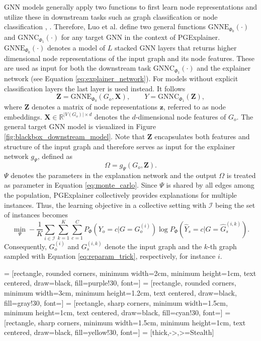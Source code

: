 GNN models generally apply two functions to first learn node representations and utilize these in downstream tasks such as graph classification or node classification \cite{kipf2016semi}, \cite{velivckovic2017graph}. Therefore, Luo et al. \cite{luo2020parameterized} define two general functions $\text{GNNE}_{\Phi_0}(\cdot)$ and $\text{GNNC}_{\Phi_1}(\cdot)$ for any target GNN in the context of PGExplainer. $\text{GNNE}_{\Phi_0}(\cdot)$ denotes a model of $L$ stacked GNN layers that returns higher dimensional node representations of the input graph and its node features. These are used as input for both the downstream task $\text{GNNC}_{\Phi_1}(\cdot)$ and the explainer network (see Equation \ref{eq:explainer_network}). For models without explicit classification layers the last layer is used instead. It follows
\begin{equation}
    \mathbf{Z} = \text{GNNE}_{\Phi_0}(G_o, \mathbf{X}), \qquad Y = \text{GNNC}_{\Phi_1}(\mathbf{Z}),
\end{equation}
where $\mathbf{Z}$ denotes a matrix of node representations $\mathbf{z}$, referred to as node embeddings. $\mathbf{X} \in \mathbb{R}^{|V(G_o)|\times d}$ denotes the $d$-dimensional node features of $G_o$. The general target GNN model is visualized in Figure \ref{fig:blackbox_downstream_model}. Note that $\mathbf{Z}$ encapsulates both features and structure of the input graph and therefore serves as input for the explainer network $g_\Psi$, defined as
\begin{equation}
    \label{eq:explainer_network}
    \Omega = g_\Psi(G_o,\mathbf{Z}).
\end{equation}
$\Psi$ denotes the parameters in the explanation network and the output $\Omega$ is treated as parameter in Equation \ref{eq:monte_carlo}. Since $\Psi$ is shared by all edges among the population, PGExplainer collectively provides explanations for multiple instances. Thus, the learning objective in a collective setting with $\mathcal{I}$ being the set of instances becomes
\begin{equation}
    \label{eq:mlp_loss}
    \min_\Psi -\frac{1}{K}\sum_{i\in \mathcal{I}}\sum_{k=1}^K\sum_{c=1}^C P_\Phi (Y_o = c|G = G_o^{(i)}) \log P_\Phi(\hat{Y}_s = c|G=\hat{G}_s^{(i,k)}).
\end{equation}
Consequently, $G_o^{(i)}$ and $G_s^{(i,k)}$ denote the input graph and the $k$-th graph sampled with Equation \ref{eq:reparam_trick}, respectively, for instance $i$. \bigskip 

 = [rectangle, rounded corners, minimum width=2cm, minimum height=1cm, text centered, draw=black, fill=purple!30, font=\small]
 = [rectangle, rounded corners, minimum width=3cm, minimum height=1.2cm, text centered, draw=black, fill=gray!30, font=\small]
 = [rectangle, sharp corners, minimum width=1.5cm, minimum height=1cm, text centered, draw=black, fill=cyan!30, font=\small]
 = [rectangle, sharp corners, minimum width=1.5cm, minimum height=1cm, text centered, draw=black, fill=yellow!30, font=\small]
 = [thick,->,>=Stealth]    %


